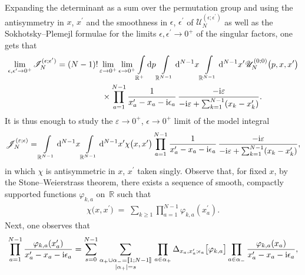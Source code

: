 \documentclass[pdftex]{sigma}%
\numberwithin{equation}{section}
\begin{document}
Expanding the determinant as a sum over the permutation group and using the antisymmetry in $x$, $x^{\prime}$ and the smoothness in
$\epsilon$, $\epsilon^{\prime}$ of $\mathscr{U}_N^{(\epsilon;\epsilon^{\prime})}$ as well as the Sokhotsky--Plemejl formulae for the limits
$\epsilon, \epsilon^{\prime} \rightarrow 0^+$ of the singular factors, one gets that
\begin{gather*}
\lim_{ \epsilon,\epsilon^{\prime}\rightarrow 0^+ } \mathscr{I}_N^{(\epsilon;\epsilon^{\prime})} =
 (N-1)! \lim_{\varepsilon\rightarrow 0^+} \lim_{ \epsilon \rightarrow 0^+ }
\int\limits_{\mathbb{R}^+}{} {\rm d}p \int\limits_{\mathbb{R}^{N-1}}{} {\rm d}^{N-1}x
\int\limits_{\mathbb{R}^{N-1}}{} {\rm d}^{N-1}x^{\prime} \mathscr{U}_N^{(0;0)}\big(p,x,x^{\prime} \big)
\\ \hphantom{\lim_{ \epsilon,\epsilon^{\prime}\rightarrow 0^+ } \mathscr{I}_N^{(\epsilon;\epsilon^{\prime})} =}
\times \prod\limits_{a=1}^{N-1} \frac{ 1 }{ x^{\prime}_a - x_a -{\rm i} \epsilon_a } \,\frac{-{\rm i} \varepsilon }{
 -{\rm i} \varepsilon + \sum_{k=1}^{N-1}(x_k - x_k^{\prime}) }.
\end{gather*}
It is thus enough to study the $\varepsilon\rightarrow 0^+$, $\epsilon \rightarrow 0^+ $ limit of the model integral
\begin{gather*}
\mathscr{J}_N^{(\varepsilon;\epsilon)} = \int\limits_{\mathbb{R}^{N-1}}{} {\rm d}^{N-1}x
\int\limits_{\mathbb{R}^{N-1}}{} {\rm d}^{N-1}x^{\prime} \chi\big(x,x^{\prime} \big)
 \prod\limits_{a=1}^{N-1} \frac{1}{x^{\prime}_a-x_a-{\rm i} \epsilon_a }
\, \frac{-{\rm i} \varepsilon }{-{\rm i} \varepsilon + \sum_{k=1}^{N-1}(x_k - x_k^{\prime}) },
\end{gather*}
in which $\chi$ is antisymmetric in $x$, $x^{\prime}$ taken singly. Observe that, for fixed $x$, by the Stone--Weierstrass theorem, there
exists a sequence of smooth, compactly supported functions $\varphi_{k,a}$ on~$\mathbb{R}$ such that
\begin{gather*}
 \chi\big(x,x^{\prime} \big) \; = \; \sum_{k\geq 1 }{} \prod\limits_{a=1}^{N-1}\varphi_{k,a}(x_a^{\prime}).
\end{gather*}
Next, one observes that
\begin{gather*}
\prod\limits_{a=1}^{N-1} \frac{ \varphi_{k,a}(x_a^{\prime}) }{x^{\prime}_a-x_a-{\rm i} \epsilon_a }
 = \sum_{s=0}^{N-1} \sum\limits_{ \substack{ \alpha_+\cup \alpha_- = [\![1;N-1]\!] \\ |\alpha_+|=s } }{}
\prod\limits_{a \in \alpha_+}{} \Delta_{x_a,x_a^{\prime}; \epsilon_a}\big[ \varphi_{k,a}\big] \prod\limits_{a \in \alpha_-}{}
\frac{ \varphi_{k,a}(x_a ) }{x^{\prime}_a-x_a-{\rm i} \epsilon_a },
\end{gather*}
\end{document}
